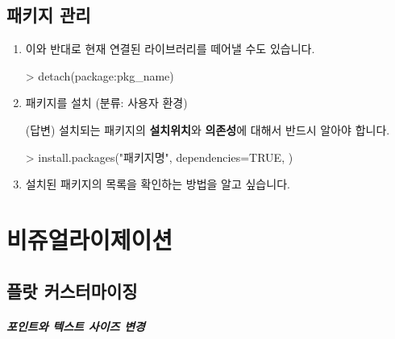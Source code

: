 \documentclass{report}
\begin{document}
\section{패키지 관리}
\begin{enumerate}
\item 	이와 반대로 현재 연결된 라이브러리를 떼어낼 수도 있습니다. 

	\begin{Schunk}
	\begin{Soutput}
	> detach(package:pkg_name)	
	\end{Soutput}
	\end{Schunk}


	\item 패키지를 설치 (분류: 사용자 환경)  
	
	\textsf{(답변)} 설치되는 패키지의 \textbf{설치위치}와 \textbf{의존성}에 대해서 반드시 알아야 합니다. 
	
	\begin{Schunk}
	\begin{Soutput}
	> install.packages("패키지명", dependencies=TRUE, )
	\end{Soutput}
	\end{Schunk}

	\item 설치된 패키지의 목록을 확인하는 방법을 알고 싶습니다.
\end{enumerate}


%
%

\chapter{비쥬얼라이제이션}

\section{플랏 커스터마이징}
\paragraph{포인트와 텍스트 사이즈 변경}
\end{document}
